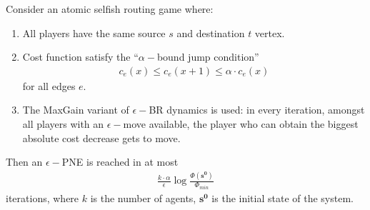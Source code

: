 \begin{thm}
Consider an atomic selfish routing game where:
\begin{enumerate}[1.]
\item All players have the same source $s$ and destination $t$ vertex.
\item Cost function satisfy the ``$\alpha-$bound jump condition''
\begin{align*}
c_e(x)\leq c_e(x+1)\leq\alpha\cdot c_e(x)
\end{align*}
for all edges $e$.
\item The MaxGain variant of $\epsilon-$BR dynamics is used: in every iteration, amongst all players with an $\epsilon-$move available, the player who can obtain the biggest absolute cost decrease gets to move.
\end{enumerate}
 Then an $\epsilon-$PNE is reached in at most
 \begin{align*}
 \frac{k \cdot \alpha}{\epsilon}\log\frac{\Phi(\mathbf{s^0})}{\Phi_{min}}
 \end{align*}
 iterations, where $k$ is the number of agents, $\mathbf{s^0}$ is the initial state of the system.
\end{thm}








